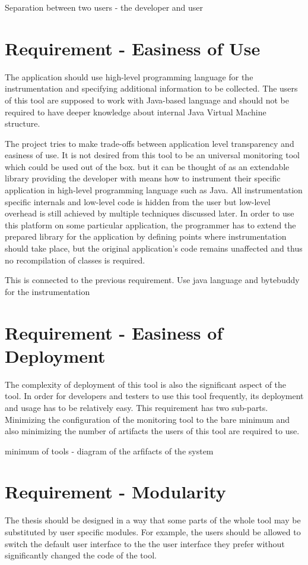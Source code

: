 Separation between two users - the developer and user
\section{Requirement - Easiness of Use}
The application should use high-level programming language for the instrumentation and specifying additional information to be collected. The users of this tool are supposed to work with Java-based language and should not be required to have deeper knowledge about internal Java Virtual Machine structure.

The project tries to make trade-offs between application level transparency and easiness of use. It is not desired from this tool to be an universal monitoring tool which could be used out of the box. but it can be thought of as an extendable library providing the developer with means how to instrument their specific application in high-level programming language such as Java. All instrumentation specific internals and low-level code is hidden from the user but low-level overhead is still achieved by multiple techniques discussed later. In order to use this platform on some particular application, the programmer has to extend the prepared library for the application by defining points where instrumentation should take place, but the original application's code remains unaffected and thus no recompilation of classes is required.


This is connected to the previous requirement. Use java language and bytebuddy for the instrumentation
\section{Requirement - Easiness of Deployment}
The complexity of deployment of this tool is also the significant aspect of the tool. In order for developers and testers to use this tool frequently, its deployment and usage has to be relatively easy. This requirement has two sub-parts. Minimizing the configuration of the monitoring tool to the bare minimum and also minimizing the number of artifacts the users of this tool are required to use.


minimum of tools - diagram of the arfifacts of the system
\section{Requirement - Modularity}
The thesis should be designed in a way that some parts of the whole tool may be substituted by user specific modules. For example, the users should be allowed to switch the default user interface to the the user interface they prefer without significantly changed the code of the tool.

